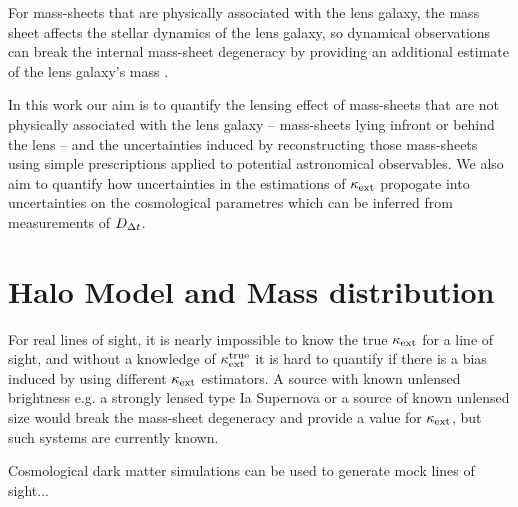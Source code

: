 \documentclass[useAMS,usenatbib]{mn2e}
\begin{document}
For mass-sheets that are physically associated with the lens galaxy, the mass sheet
 affects the stellar dynamics of the
lens galaxy, so dynamical observations can break the internal
mass-sheet degeneracy by providing an additional estimate of the lens galaxy's mass
\citep[e.g.,][]{citations}. 

In this work our aim is to quantify the lensing effect of mass-sheets that are not physically associated with the lens galaxy -- mass-sheets
lying infront or behind the lens -- and the uncertainties induced by reconstructing
those mass-sheets using simple prescriptions applied to potential astronomical observables.
We also aim to quantify how uncertainties in the
estimations of $\kappa_{\rm ext}$ propogate into uncertainties on the cosmological parametres
which can be inferred from measurements of $D_{\Delta t}$.



\section{Halo Model and Mass distribution}
\label{sec:model}

%



For real lines of sight, it is nearly impossible to know the true $\kappa_{\rm ext}$ for a
line of sight, and without a knowledge of $\kappa_{\rm ext}^{\mathrm{true}}$ it is hard to
quantify if there is a bias induced by using different $\kappa_{\rm ext}$ estimators.
A source with known unlensed brightness e.g. a strongly lensed type Ia
Supernova  or a source of known unlensed size 
would break the mass-sheet degeneracy and provide a value for $\kappa_{\rm ext}$, but
 such systems are currently known.

Cosmological dark matter simulations can be used to generate mock lines of sight...
\end{document}
